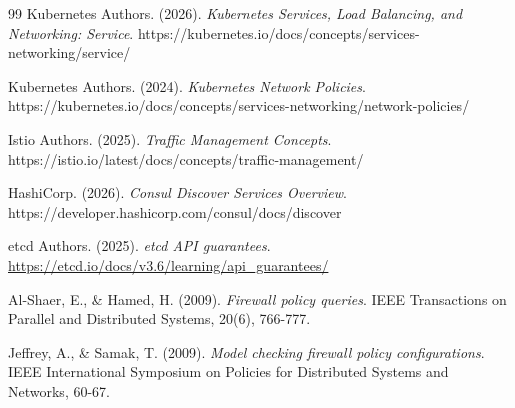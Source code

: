 \documentclass[10pt,a4paper]{article}
\begin{document}
\begin{thebibliography}{99}
Kubernetes Authors. (2026).
\textit{Kubernetes Services, Load Balancing, and Networking: Service}.
https://kubernetes.io/docs/concepts/services-networking/service/

Kubernetes Authors. (2024).
\textit{Kubernetes Network Policies}.
https://kubernetes.io/docs/concepts/services-networking/network-policies/

Istio Authors. (2025).
\textit{Traffic Management Concepts}.
https://istio.io/latest/docs/concepts/traffic-management/

HashiCorp. (2026).
\textit{Consul Discover Services Overview}.
https://developer.hashicorp.com/consul/docs/discover

etcd Authors. (2025).
\textit{etcd API guarantees}.
\url{https://etcd.io/docs/v3.6/learning/api_guarantees/}

Al-Shaer, E., \& Hamed, H. (2009).
\textit{Firewall policy queries}.
IEEE Transactions on Parallel and Distributed Systems, 20(6), 766-777.

Jeffrey, A., \& Samak, T. (2009).
\textit{Model checking firewall policy configurations}.
IEEE International Symposium on Policies for Distributed Systems and Networks, 60-67.

\end{thebibliography}
\end{document}
